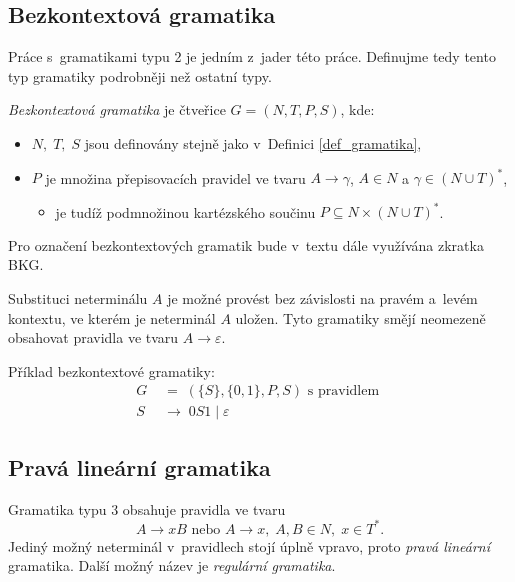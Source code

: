 \subsection*{Bezkontextová gramatika}
Práce s~gramatikami typu 2 je jedním z~jader této práce.
Definujme tedy tento typ gramatiky podrobněji než ostatní typy.
\begin{definition}\label{def_bkg}
    \emph{Bezkontextová gramatika} je čtveřice $G = (N, T, P, S)$, kde:
    \begin{itemize}
        \item $N,\; T,\; S$ jsou definovány stejně jako v~Definici \ref{def_gramatika}, 
        \item $P$ je množina přepisovacích pravidel ve tvaru $A \rightarrow \gamma $, $A \in N$ a $\gamma \in (N \cup T)^*$,
        \begin{itemize}[label=$\circ$]
            \item je tudíž podmnožinou kartézského součinu $P \subseteq  N \times (N \cup T)^*$. 
        \end{itemize}
    \end{itemize}
\end{definition}

\begin{convention}
    Pro označení bezkontextových gramatik bude v~textu dále využívána zkratka BKG.
\end{convention}

Substituci neterminálu $A$ je možné provést bez závislosti na pravém a~levém kontextu, ve kterém je neterminál $A$ uložen.
Tyto gramatiky smějí neomezeně obsahovat pravidla ve tvaru $A \rightarrow \varepsilon$.

\begin{example}
    Příklad bezkontextové gramatiky:
    \begin{align*}
        G \; &= \; (\{S\}, \{0, 1\}, P, S) \text{ s~pravidlem } \\
        S~\; &\rightarrow \; 0S1 \; | \; \varepsilon
    \end{align*}
\end{example}

\subsection*{Pravá lineární gramatika}
Gramatika typu 3 obsahuje pravidla ve tvaru
\begin{equation*}
    A \rightarrow xB \text { nebo } A \rightarrow x,\; A, B \in N,\; x \in T^*.
\end{equation*}
Jediný možný neterminál v~pravidlech stojí úplně vpravo, proto \emph{pravá lineární} gramatika.
Další možný název je \emph{regulární gramatika}.

